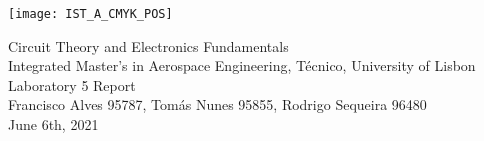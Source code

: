 
\thispagestyle {empty}

\texttt{[image: IST\_A\_CMYK\_POS]}

\begin{center}
%
\vspace{1.0cm}

\vspace{1cm}
{\FontLb Circuit Theory and Electronics Fundamentals} \\ %
\vspace{1cm}
{\FontSn Integrated Master's in Aerospace Engineering, Técnico, University of Lisbon} \\ 
\vspace{1cm}
{\FontSn Laboratory 5 Report} \\ 
\vspace{1cm}
{\FontSn Francisco Alves 95787, Tomás Nunes 95855, Rodrigo Sequeira 96480} \\ 
\vspace{1cm}
{\FontSn June 6th, 2021} 
%
\end{center}

